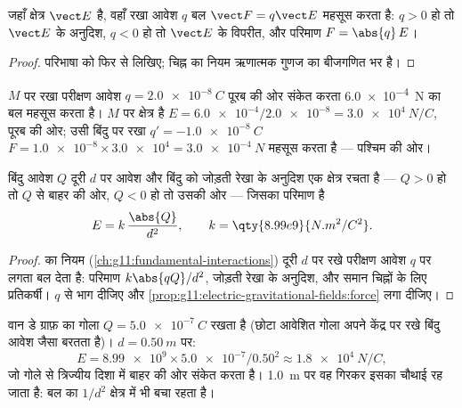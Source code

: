 \begin{proposition}[आवेश पर बल]\label{prop:g11:electric-gravitational-fields:force}
जहाँ क्षेत्र $\vect E$ है, वहाँ रखा आवेश $q$ बल $\vect F = q \vect E$
महसूस करता है: $q > 0$ हो तो $\vect E$ के अनुदिश, $q < 0$ हो तो $\vect E$ के
विपरीत, और परिमाण $F = \abs{q}\,E$।
\end{proposition}

\begin{proof}
परिभाषा को फिर से लिखिए; चिह्न का नियम ऋणात्मक गुणज का बीजगणित भर है।
\end{proof}

\begin{example}[क्षेत्र पढ़ना]\label{ex:g11:electric-gravitational-fields:reading}
$M$ पर रखा परीक्षण आवेश $q = \qty{+2.0e-8}{C}$ पूरब की ओर संकेत करता \qty{6.0e-4}{N} का
बल महसूस करता है। $M$ पर क्षेत्र है $E = \num{6.0e-4} / \num{2.0e-8} = \qty{3.0e4}{N/C}$, पूरब की ओर;
उसी बिंदु पर रखा $q' = \qty{-1.0e-8}{C}$ $F = \num{1.0e-8} \times \num{3.0e4} = \qty{3.0e-4}{N}$ महसूस करता है --- पश्चिम की ओर।
\end{example}

\begin{proposition}[बिंदु आवेश का क्षेत्र]\label{prop:g11:electric-gravitational-fields:point}
बिंदु आवेश $Q$ दूरी $d$ पर आवेश और बिंदु को जोड़ती रेखा के अनुदिश एक
क्षेत्र रचता है --- $Q > 0$ हो तो $Q$ से बाहर की ओर, $Q < 0$ हो तो
उसकी ओर --- जिसका परिमाण है
\[
E = k\,\frac{\abs{Q}}{d^2},
\qquad k = \qty{8.99e9}{N.m^2/C^2}.
\]
\end{proposition}

\begin{proof}
 का नियम (\cref{ch:g11:fundamental-interactions}) दूरी $d$ पर रखे परीक्षण आवेश $q$ पर लगता
बल देता है: परिमाण $k \abs{qQ} / d^2$, जोड़ती रेखा के अनुदिश, और समान चिह्नों के
लिए प्रतिकर्षी। $q$ से भाग दीजिए और \cref{prop:g11:electric-gravitational-fields:force} लगा दीजिए।
\end{proof}

\begin{example}[एक आवेशित गोला]\label{ex:g11:electric-gravitational-fields:sphere}
वान डे ग्राफ़ का गोला $Q = \qty{+5.0e-7}{C}$ रखता है (छोटा आवेशित गोला अपने केंद्र पर रखे
बिंदु आवेश जैसा बरतता है)। $d = \qty{0.50}{m}$ पर:
\[
E = \num{8.99e9} \times \num{5.0e-7} / 0.50^2 \approx \qty{1.8e4}{N/C},
\]
जो गोले से त्रिज्यीय दिशा में बाहर की ओर संकेत करता है। \qty{1.0}{m} पर वह गिरकर
इसका चौथाई रह जाता है: बल का $1/d^2$ क्षेत्र में भी बचा रहता
है।
\end{example}

